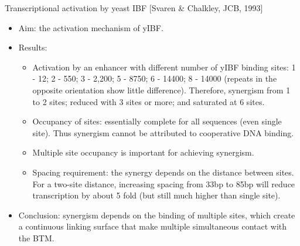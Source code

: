 \documentclass{report}
\begin{document}
Transcriptional activation by yeast IBF [Svaren \& Chalkley, JCB, 1993]
\begin{itemize}
	\item Aim: the activation mechanism of yIBF. 
	
	\item Results: 
	\begin{itemize}
		\item Activation by an enhancer with different number of yIBF binding sites: 1 - 12; 2 - 550; 3 - 2,200; 5 - 8750; 6 - 14400; 8 - 14000 (repeats in the opposite orientation show little difference). Therefore, synergism from 1 to 2 sites;  reduced with 3 sites or more; and saturated at 6 sites. 
		\item Occupancy of sites: essentially complete for all sequences (even single site). Thus synergism cannot be attributed to cooperative DNA binding. 
		\item Multiple site occupancy is important for achieving synergism. 
		\item Spacing requirement: the synergy depends on the distance between sites. For a two-site distance, increasing spacing from 33bp to 85bp will reduce transcription by about 5 fold (but still much higher than single site). 
	\end{itemize}
	
	\item Conclusion: synergism depends on the binding of multiple sites, which create a continuous linking surface that make multiple simultaneous contact with the BTM. 
\end{itemize}
\end{document}
